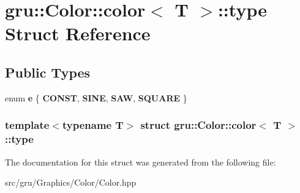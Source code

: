 \hypertarget{structgru_1_1Color_1_1color_1_1type}{\section{gru\-:\-:\-Color\-:\-:color$<$ \-T $>$\-:\-:type \-Struct \-Reference}
\label{structgru_1_1Color_1_1color_1_1type}
}
\subsection*{\-Public \-Types}
\begin{DoxyCompactItemize}
\item 
enum {\bfseries e} \{ {\bfseries \-C\-O\-N\-S\-T}, 
{\bfseries \-S\-I\-N\-E}, 
{\bfseries \-S\-A\-W}, 
{\bfseries \-S\-Q\-U\-A\-R\-E}
 \}
\end{DoxyCompactItemize}
\subsubsection*{template$<$typename \-T$>$ struct gru\-::\-Color\-::color$<$ T $>$\-::type}



\-The documentation for this struct was generated from the following file\-:\begin{DoxyCompactItemize}
\item 
src/gru/\-Graphics/\-Color/\-Color.\-hpp\end{DoxyCompactItemize}
